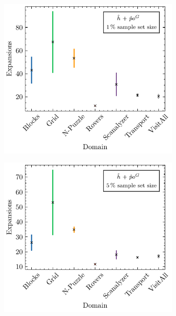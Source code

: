 \documentclass[ppgc,diss,english]{iiufrgs}
\begin{document}
\begin{figure}[tb]
  \caption[Standard deviation of expansions using \hnn with \pog]{Mean number of expansions and its standard deviation per domain for DQ-GBFS guided by \hnn with \pog trained using sample sets of different sizes.}
  \centering
  \vspace{\baselineskip}
  \begin{subfigure}{0.41\textwidth}
    \centering
    \includegraphics[width=\linewidth]{img/error_hNN_poG_1pct.pdf}
  \end{subfigure}
  \begin{subfigure}{0.41\textwidth}
    \centering
    \includegraphics[width=\linewidth]{img/error_hNN_poG_5pct.pdf}
  \end{subfigure}



\end{figure}
\end{document}
